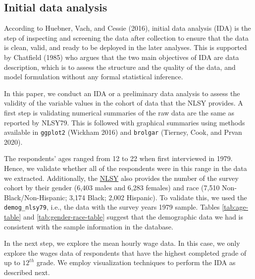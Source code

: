 \documentclass{article}
\begin{document}
\hypertarget{ida}{%
\subsection{Initial data analysis}\label{ida}}

According to Huebner, Vach, and Cessie (2016), initial data analysis (IDA) is the step of inspecting and screening the data after collection to ensure that the data is clean, valid, and ready to be deployed in the later analyses. This is supported by Chatfield (1985) who argues that the two main objectives of IDA are data description, which is to assess the structure and the quality of the data, and model formulation without any formal statistical inference.

In this paper, we conduct an IDA or a preliminary data analysis to assess the validity of the variable values in the cohort of data that the NLSY provides. A first step is validating numerical summaries of the raw data are the same as reported by NLSY79. This is followed with graphical summaries using methods available in \texttt{ggplot2} (Wickham 2016) and \texttt{brolgar} (Tierney, Cook, and Prvan 2020).

The respondents' ages ranged from 12 to 22 when first interviewed in 1979. Hence, we validate whether all of the respondents were in this range in the data we extracted. Additionally, the \href{https://www.nlsinfo.org/content/cohorts/nlsy79/intro-to-the-sample/nlsy79-sample-introduction}{NLSY} also provides the number of the survey cohort by their gender (6,403 males and 6,283 females) and race (7,510 Non-Black/Non-Hispanic; 3,174 Black; 2,002 Hispanic). To validate this, we used the \texttt{demog\_nlsy79}, i.e., the data with the survey years 1979 sample. Tables \ref{tab:age-table} and \ref{tab:gender-race-table} suggest that the demographic data we had is consistent with the sample information in the database.

In the next step, we explore the mean hourly wage data. In this case, we only explore the wages data of respondents that have the highest completed grade of up to \(12^{th}\) grade. We employ visualization techniques to perform the IDA as described next.
\end{document}
